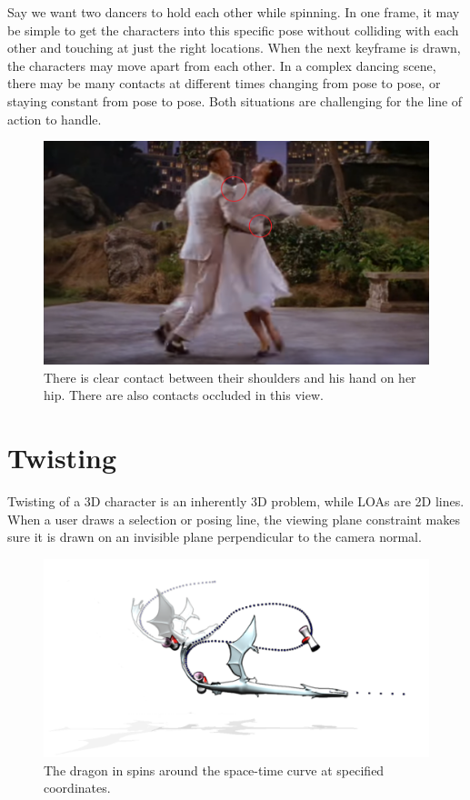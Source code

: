 Say we want two dancers to hold each other while spinning. In one frame, it may be simple to get the characters into this specific pose without colliding with each other and touching at just the right locations. When the next keyframe is drawn, the characters may move apart from each other. In a complex dancing scene, there may be many contacts at different times changing from pose to pose, or staying constant from pose to pose. Both situations are challenging for the line of action to handle.

\begin{figure}[!h]
\centering
\includegraphics[scale=0.5]{img/contact}
\caption{There is clear contact between their shoulders and his hand on her hip. There are also contacts occluded in this view.}
\end{figure}

\section{Twisting}
Twisting of a 3D character is an inherently 3D problem, while LOAs are 2D lines. When a user draws a selection or posing line, the viewing plane constraint makes sure it is drawn on an invisible plane perpendicular to the camera normal. 

\begin{figure}[!h]
\centering
\includegraphics[scale=0.5]{img/twisting}
\caption{The dragon in \citep{guay2015space} spins around the space-time curve at specified coordinates.}
\end{figure}


